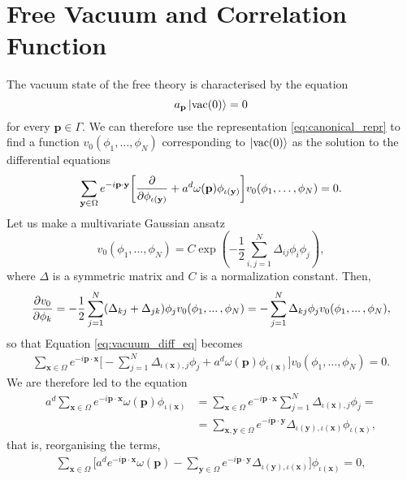 \documentclass[a4paper,10pt]{report}
\begin{document}
\section{Free Vacuum and Correlation Function}
The vacuum state of the free theory is characterised by the equation
\begin{equation}
\label{eq:vac_def}
a_\mathbf{p}\ket{\mathrm{vac}(0)} = 0
\end{equation}
for every $\mathbf{p}\in\Gamma$. We can therefore use the representation \eqref{eq:canonical_repr} to find a function $v_0(\phi_1,\dots,\phi_N)$ corresponding to $\ket{\mathrm{vac}(0)}$ as the solution to the differential equations
\begin{equation}
\label{eq:vacuum_diff_eq}
\sum_{\mathbf{y}\in\Omega}e^{-i\mathbf{p}\cdot\mathbf{y}}\bigg[\pdv{}{\phi_{\iota(\mathbf{y})}} + a^d\omega(\mathbf{p})\phi_{\iota(\mathbf{y})}\bigg]v_0(\phi_1,\dots,\phi_N) = 0.
\end{equation}
Let us make a multivariate Gaussian ansatz
\begin{equation}
\label{eq:vacuum_wavefunction}
v_0(\phi_1,\dots,\phi_N) = C\exp(-\frac{1}{2}\sum_{i,j=1}^N\Delta_{ij}\phi_i\phi_j),
\end{equation}
where $\Delta$ is a symmetric matrix and $C$ is a normalization constant. Then, 
\begin{equation}
\pdv{v_0}{\phi_k} = -\frac{1}{2}\sum_{j=1}^N(\Delta_{kj} + \Delta_{jk})\phi_jv_0(\phi_1,...\,,\phi_N) = -\sum_{j=1}^N\Delta_{kj}\phi_jv_0(\phi_1,...\,,\phi_N),
\end{equation}
so that Equation \eqref{eq:vacuum_diff_eq} becomes
\begin{align}
\sum_{\mathbf{x}\in\Omega}e^{-i\mathbf{p}\cdot\mathbf{x}}\bigg[-\sum_{j=1}^N\Delta_{\iota(\mathbf{x}),j}\phi_j + a^d\omega(\mathbf{p})\phi_{\iota(\mathbf{x})}\bigg]v_0(\phi_1,\dots,\phi_N) = 0.
\end{align}
We are therefore led to the equation
\begin{align}
a^d\sum_{\mathbf{x}\in\Omega}e^{-i\mathbf{p}\cdot\mathbf{x}}\omega(\mathbf{p})\phi_{\iota(\mathbf{x})} &= \sum_{\mathbf{x}\in\Omega}e^{-i\mathbf{p}\cdot\mathbf{x}}\sum_{j=1}^N\Delta_{\iota(\mathbf{x}),j}\phi_j = \nonumber\\
&= \sum_{\mathbf{x},\mathbf{y}\in\Omega}e^{-i\mathbf{p}\cdot\mathbf{y}}\Delta_{\iota(\mathbf{y}),\iota(\mathbf{x})}\phi_{\iota(\mathbf{x})},
\end{align}
that is, reorganising the terms,
\begin{align}
\sum_{\mathbf{x}\in\Omega}\bigg[a^d e^{-i\mathbf{p}\cdot\mathbf{x}}\omega(\mathbf{p}) - \sum_{\mathbf{y}\in\Omega}e^{-i\mathbf{p}\cdot\mathbf{y}}\Delta_{\iota(\mathbf{y}),\iota(\mathbf{x})}\bigg]\phi_{\iota(\mathbf{x})} = 0,
\end{align}
\end{document}
